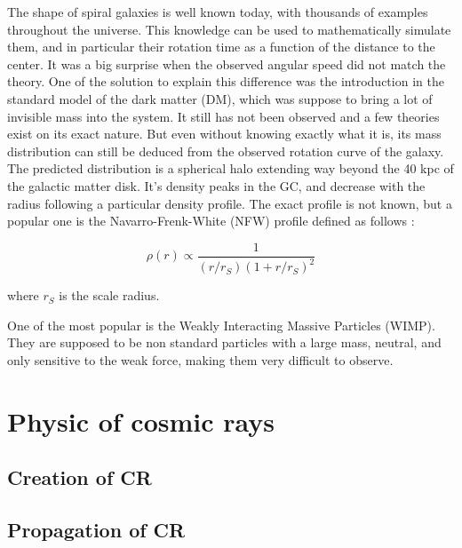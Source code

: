 The shape of spiral galaxies is well known today, with thousands of examples throughout the universe. This knowledge can be used to mathematically simulate them, and in particular their rotation time as a function of the distance to the center. It was a big surprise when the observed angular speed did not match the theory. One of the solution to explain this difference was the introduction in the standard model of the dark matter (DM), which was suppose to bring a lot of invisible mass into the system. It still has not been observed and a few theories exist on its exact nature. But even without knowing exactly what it is, its mass distribution can still be deduced from the observed rotation curve of the galaxy. The predicted distribution is a spherical halo extending way beyond the 40 kpc of the galactic matter disk. It's density peaks in the GC, and decrease with the radius following a particular density profile. The exact profile is not known, but a popular one is the Navarro-Frenk-White (NFW) profile defined as follows :

\begin{equation}
\rho (r) \propto \frac{1}{\left( r/r_S \right) \left( 1 + r/r_S \right)^2 }
\end{equation}

where $r_S$ is the scale radius.

One of the most popular is the Weakly Interacting Massive Particles (WIMP). They are supposed to be non standard particles with a large mass, neutral, and only sensitive to the weak force, making them very difficult to observe.




\section{Physic of cosmic rays}

\subsection{Creation of CR}


\subsection{Propagation of CR}

